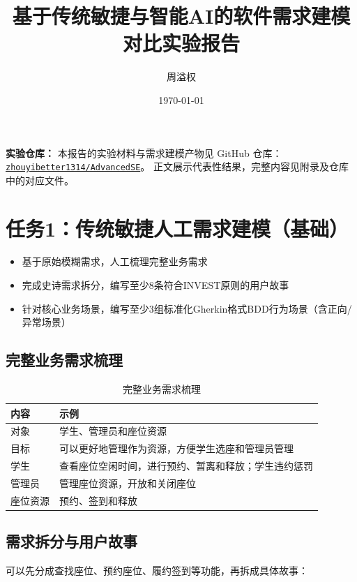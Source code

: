 \documentclass[11pt,a4paper]{article}
\title{基于传统敏捷与智能AI的软件需求建模对比实验报告}
\author{周溢权}
\date{\today}
\begin{document}
\maketitle
\tableofcontents
\newpage

\noindent\textbf{实验仓库：}
本报告的实验材料与需求建模产物见 GitHub 仓库：
\href{https://github.com/zhouyibetter1314/AdvancedSE}
{\texttt{zhouyibetter1314/AdvancedSE}}。
正文展示代表性结果，完整内容见附录及仓库中的对应文件。

\medskip

\section{任务1：传统敏捷人工需求建模（基础）}

\begin{itemize}
    \item 基于原始模糊需求，人工梳理完整业务需求
    \item 完成史诗需求拆分，编写至少8条符合INVEST原则的用户故事
    \item 针对核心业务场景，编写至少3组标准化Gherkin格式BDD行为场景（含正向/异常场景）
\end{itemize}

\subsection{完整业务需求梳理}

\begin{table}[htbp]
    \centering
    \caption{完整业务需求梳理}
    \begin{tabular}{@{}p{}p{}@{}}
        \toprule
        \textbf{内容} & \textbf{示例} \\
        \midrule
        对象 & 学生、管理员和座位资源 \\
        目标 & 可以更好地管理作为资源，方便学生选座和管理员管理 \\
        学生 & 查看座位空闲时间，进行预约、暂离和释放；学生违约惩罚 \\
        管理员 & 管理座位资源，开放和关闭座位 \\
        座位资源 & 预约、签到和释放 \\
        \bottomrule
    \end{tabular}
\end{table}

\subsection{需求拆分与用户故事}
可以先分成查找座位、预约座位、履约签到等功能，再拆成具体故事：
\end{document}
